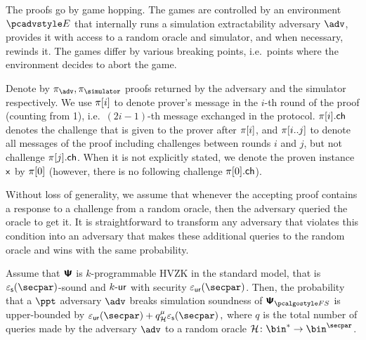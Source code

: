 \documentclass[runningheads,11pt]{llncs}
\begin{document}
The proofs go by game hopping. The games are controlled by an environment $\env$
that internally runs a simulation extractability adversary $\advse$, provides it
with access to a random oracle and simulator, and when necessary, rewinds it. The
games differ by various breaking points, i.e.~points where the environment
decides to abort the game.

Denote by $\zkproof_{\advse}, \zkproof_{\simulator}$ proofs returned by the
adversary and the simulator respectively. We use $\pi[i]$ to denote
prover's message in the $i$-th round of the proof (counting from 1),
i.e.~$(2i - 1)$-th message exchanged in the protocol. $\pi[i].\mathsf{ch}$ denotes
the challenge that is given to the prover after $\pi[i]$, and
$\pi[i..j]$ to denote all messages of the proof including challenges
between rounds $i$ and $j$, but not challenge $\pi[j].\mathsf{ch}$. When it is not
explicitly stated, we denote the proven instance $\mathsf{x}$ by $\pi[0]$
(however, there is no following challenge $\pi[0].\mathsf{ch}$).

Without loss of generality, we assume that whenever the accepting proof contains
a response to a challenge from a random oracle, then the adversary queried the
oracle to get it. It is straightforward to transform any adversary that violates
this condition into an adversary that makes these additional queries to the
random oracle and wins with the same probability.

\begin{theorem}
  \label{thm:simsnd}
  Assume that $\bm{\mathsf{\Psi}}$ is $k$-programmable HVZK in the standard model, that is
  $\epss(\secpar)$-sound and ${k\text{-}\mathsf{ur}}$ with security $\epsur(\secpar)$. Then, the
  probability that a $\ppt$ adversary $\adv$ breaks simulation soundness of
  $\ps_{\fs}$ is upper-bounded by
  \(
    \epsur(\secpar) + q_\ro^\mu  \epss(\secpar)\,,
  \)
  where $q$ is the total number of queries made by the adversary $\adv$ to a
  random oracle $\ro\colon \bin^{*} \to \bin^{\secpar}$.
\end{theorem}
\end{document}

